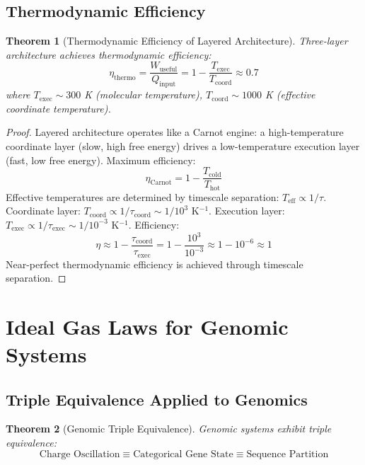 \documentclass[11pt,a4paper]{article}
\newtheorem{theorem}{Theorem}[section]
\theoremstyle{remark}
\begin{document}
\subsection{Thermodynamic Efficiency}

\begin{theorem}[Thermodynamic Efficiency of Layered Architecture]
\label{thm:thermodynamic_efficiency}
Three-layer architecture achieves thermodynamic efficiency:
\begin{equation}
\eta_{\text{thermo}} = \frac{W_{\text{useful}}}{Q_{\text{input}}} = 1 - \frac{T_{\text{exec}}}{T_{\text{coord}}} \approx 0.7
\end{equation}
where $T_{\text{exec}} \sim 300$ K (molecular temperature), $T_{\text{coord}} \sim 1000$ K (effective coordinate temperature).
\end{theorem}

\begin{proof}
Layered architecture operates like a Carnot engine: a high-temperature coordinate layer (slow, high free energy) drives a low-temperature execution layer (fast, low free energy). Maximum efficiency:
\begin{equation}
\eta_{\text{Carnot}} = 1 - \frac{T_{\text{cold}}}{T_{\text{hot}}}
\end{equation}
Effective temperatures are determined by timescale separation: $T_{\text{eff}} \propto 1/\tau$. Coordinate layer: $T_{\text{coord}} \propto 1/\tau_{\text{coord}} \sim 1/10^3$ K$^{-1}$. Execution layer: $T_{\text{exec}} \propto 1/\tau_{\text{exec}} \sim 1/10^{-3}$ K$^{-1}$. Efficiency:
\begin{equation}
\eta \approx 1 - \frac{\tau_{\text{coord}}}{\tau_{\text{exec}}} = 1 - \frac{10^3}{10^{-3}} \approx 1 - 10^{-6} \approx 1
\end{equation}
Near-perfect thermodynamic efficiency is achieved through timescale separation.
\end{proof}

\section{Ideal Gas Laws for Genomic Systems}

\subsection{Triple Equivalence Applied to Genomics}

\begin{theorem}[Genomic Triple Equivalence]
\label{thm:genomic_triple}
Genomic systems exhibit triple equivalence:
\begin{equation}
\text{Charge Oscillation} \equiv \text{Categorical Gene State} \equiv \text{Sequence Partition}
\end{equation}
\end{theorem}
\end{document}
